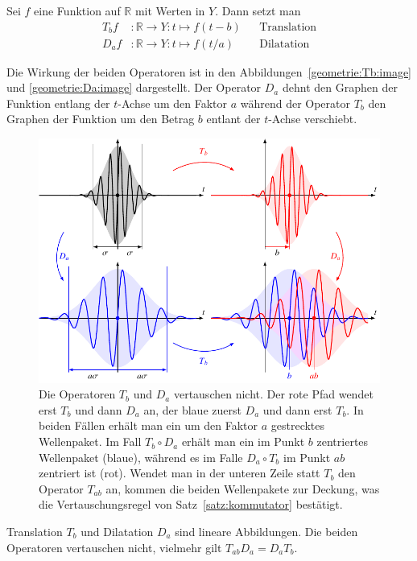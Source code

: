 \begin{definition}
Sei $f$ eine Funktion auf $\mathbb R$ mit Werten in $Y$.
Dann setzt man
\begin{align*}
T_bf&\colon \mathbb R \to Y: t\mapsto f(t-b)&&\text{Translation}
\\
D_af&\colon \mathbb R \to Y: t\mapsto f(t/a)&&\text{Dilatation}
\end{align*}
\end{definition}

Die Wirkung der beiden Operatoren ist in den
Abbildungen~\ref{geometrie:Tb:image} und \ref{geometrie:Da:image} dargestellt.
Der Operator $D_a$ dehnt den Graphen der Funktion entlang der
$t$-Achse um den Faktor $a$ während der Operator $T_b$ den Graphen
der Funktion um den Betrag $b$ entlant der $t$-Achse verschiebt.

\begin{figure}
\centering
\includegraphics[width=\hsize]{chapters/1-geometrie/images/kommutator.pdf}
\caption{Die Operatoren $T_b$ und $D_a$ vertauschen nicht.
Der rote Pfad wendet erst $T_b$ und dann $D_a$ an, der blaue zuerst
$D_a$ und dann erst $T_b$.
In beiden Fällen erhält man ein um den Faktor $a$ gestrecktes
Wellenpaket.
Im Fall $T_b\circ D_a$ erhält man ein im Punkt $b$ zentriertes Wellenpaket
(blaue), während es im Falle $D_a\circ T_b$ im Punkt $ab$ zentriert ist (rot).
Wendet man in der unteren Zeile statt $T_b$ den Operator $T_{ab}$ an, 
kommen die beiden Wellenpakete zur Deckung, was die Vertauschungsregel
von Satz~\ref{satz:kommutator} bestätigt.
\label{geometrie:kommutator:image}}
\end{figure}

\begin{satz}
\label{satz:kommutator}
Translation $T_b$ und Dilatation $D_a$ sind lineare Abbildungen.
Die beiden Operatoren vertauschen nicht, vielmehr gilt
$T_{ab}D_a = D_aT_b$.
\end{satz}

